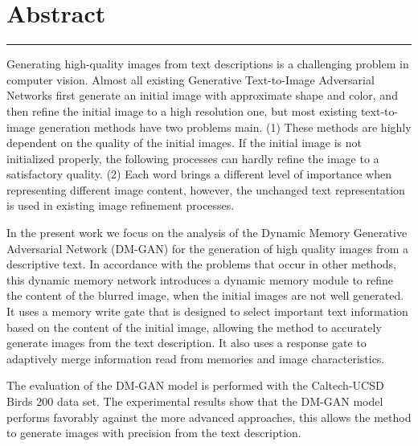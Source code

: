 \chapter*{Abstract}
\hrule \bigskip \vspace*{1cm}
Generating high-quality images from text descriptions is a challenging problem in computer vision. Almost all existing Generative Text-to-Image Adversarial Networks first generate an initial image with approximate shape and color, and then refine the initial image to a high resolution one, but most existing text-to-image generation methods have two problems main. (1) These methods are highly dependent on the quality of the initial images. If the initial image is not initialized properly, the following processes can hardly refine the image to a satisfactory quality. (2) Each word brings a different level of importance when representing different image content, however, the unchanged text representation is used in existing image refinement processes.

In the present work we focus on the analysis of the Dynamic Memory Generative Adversarial Network (DM-GAN) for the generation of high quality images from a descriptive text. In accordance with the problems that occur in other methods, this dynamic memory network introduces a dynamic memory module to refine the content of the blurred image, when the initial images are not well generated.
It uses a memory write gate that is designed to select important text information based on the content of the initial image, allowing the method to accurately generate images from the text description. It also uses a response gate to adaptively merge information read from memories and image characteristics.

The evaluation of the DM-GAN model is performed with the Caltech-UCSD Birds 200 data set. The experimental results show that the DM-GAN model performs favorably against the more advanced approaches, this allows the method to generate images with precision from the text description.


